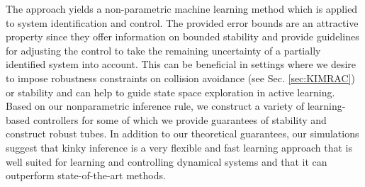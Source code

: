 The approach yields a non-parametric machine learning method which is applied to system identification and control. The provided error bounds are an attractive property since they offer information on bounded stability and provide guidelines for adjusting the control to take the remaining uncertainty of a partially identified system into account. This can be beneficial in settings where we desire to impose robustness constraints on collision avoidance (see Sec. \ref{sec:KIMRAC}) or stability and can help to guide state space exploration in active learning. Based on our nonparametric inference rule, we construct a variety of learning-based controllers for some of which we provide guarantees of stability and construct robust tubes. In addition to our theoretical guarantees, our simulations suggest that kinky inference is a very flexible and fast learning approach that is well suited for learning and controlling dynamical systems and that it can outperform state-of-the-art methods. 


